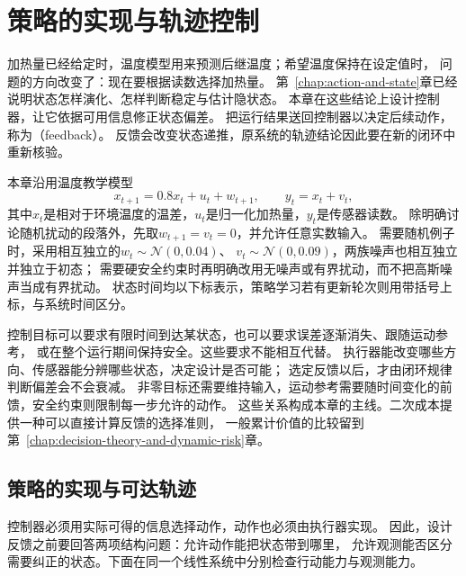 \chapter{策略的实现与轨迹控制}
\label{chap:control-theory}
\label{chap:policy-realization-and-control}

加热量已经给定时，温度模型用来预测后继温度；希望温度保持在设定值时，
问题的方向改变了：现在要根据读数选择加热量。
第~\ref{chap:action-and-state}章已经说明状态怎样演化、怎样判断稳定与估计隐状态。
本章在这些结论上设计控制器，让它依据可用信息修正状态偏差。
把运行结果送回控制器以决定后续动作，称为（feedback）。
反馈会改变状态递推，原系统的轨迹结论因此要在新的闭环中重新核验。

本章沿用温度教学模型
\begin{equation}
  x_{t+1}=0.8x_t+u_t+w_{t+1},
  \qquad y_t=x_t+v_t,
  \label{eq:control-temperature-model}
\end{equation}
其中$x_t$是相对于环境温度的温差，$u_t$是归一化加热量，$y_t$是传感器读数。
除明确讨论随机扰动的段落外，先取$w_{t+1}=v_t=0$，并允许任意实数输入。
需要随机例子时，采用相互独立的$w_t\sim\mathcal N(0,0.04)$、
$v_t\sim\mathcal N(0,0.09)$，两族噪声也相互独立并独立于初态；
需要硬安全约束时再明确改用无噪声或有界扰动，而不把高斯噪声当成有界扰动。
状态时间均以下标表示，策略学习若有更新轮次则用带括号上标，与系统时间区分。

控制目标可以要求有限时间到达某状态，也可以要求误差逐渐消失、跟随运动参考，
或在整个运行期间保持安全。这些要求不能相互代替。
执行器能改变哪些方向、传感器能分辨哪些状态，决定设计是否可能；
选定反馈以后，才由闭环规律判断偏差会不会衰减。
非零目标还需要维持输入，运动参考需要随时间变化的前馈，安全约束则限制每一步允许的动作。
这些关系构成本章的主线。二次成本提供一种可以直接计算反馈的选择准则，
一般累计价值的比较留到第~\ref{chap:decision-theory-and-dynamic-risk}章。

\section{策略的实现与可达轨迹}
\label{sec:control-feedback-structure}

控制器必须用实际可得的信息选择动作，动作也必须由执行器实现。
因此，设计反馈之前要回答两项结构问题：允许动作能把状态带到哪里，
允许观测能否区分需要纠正的状态。下面在同一个线性系统中分别检查行动能力与观测能力。

